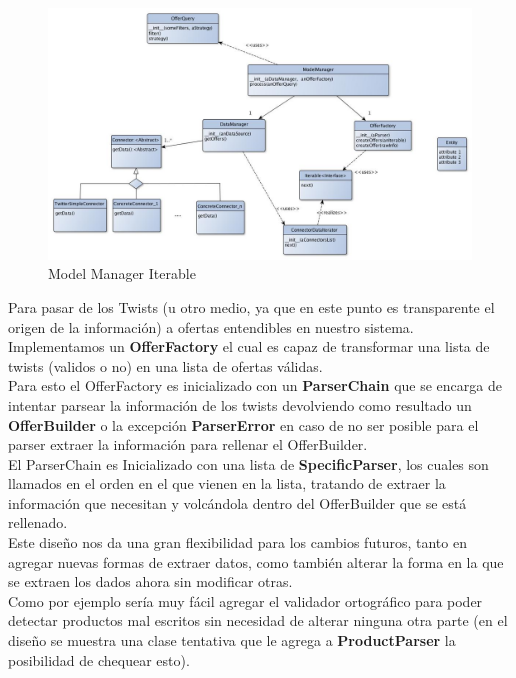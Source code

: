 \documentclass[10pt, a4paper]{article}
\begin{document}
\begin{figure}[H]
\centering
\includegraphics[scale=0.55]{graphics/model_manager_iterable_class.jpg}
\caption{Model Manager Iterable}
\end{figure}



\newpage
Para pasar de los Twists (u otro medio, ya que en este punto es transparente el origen de la información) a ofertas entendibles en nuestro sistema. Implementamos un \textbf{OfferFactory} el cual es capaz de transformar una lista de twists (validos o no) en una lista de ofertas válidas.\\

Para esto el OfferFactory es inicializado con un \textbf{ParserChain} que se encarga de intentar parsear la información de los twists devolviendo como resultado un \textbf{OfferBuilder} o la excepción  \textbf{ParserError} en caso de no ser posible para el parser extraer la información para rellenar el OfferBuilder.\\

El ParserChain es Inicializado con una lista de \textbf{SpecificParser}, los cuales son llamados en el orden en el que vienen en la lista, tratando de extraer la información que necesitan y volcándola dentro del OfferBuilder que se está rellenado.\\

Este diseño nos da una gran flexibilidad para los cambios futuros, tanto en agregar nuevas formas de extraer datos, como también alterar la forma en la que se extraen los dados ahora sin modificar otras.\\

Como por ejemplo sería muy fácil agregar el validador ortográfico para poder detectar productos mal escritos sin necesidad de alterar ninguna otra parte (en el diseño se muestra una clase tentativa que le agrega a \textbf{ProductParser} la posibilidad de chequear esto).\\
\end{document}
